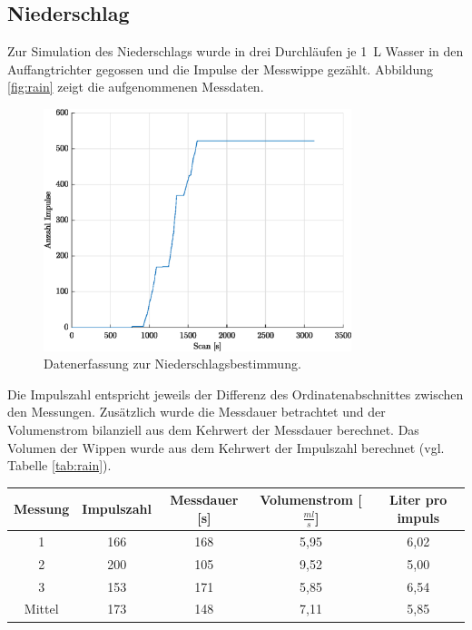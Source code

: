		
\subsection{Niederschlag}
Zur Simulation des Niederschlags wurde in drei Durchläufen je \SI{1}{\liter} Wasser in den Auffangtrichter gegossen und die Impulse der Messwippe gezählt. Abbildung \ref{fig:rain} zeigt die aufgenommenen Messdaten. 

\begin{figure}[H]
	\centering
	\includegraphics[width=0.8\textwidth]{../DATA/Messreihe_Niederschlag.eps}
	\caption[Datenerfassung zur Niederschlagsbestimmung]{Datenerfassung zur Niederschlagsbestimmung.}
	\label{fig:cal2}
\end{figure}

Die Impulszahl entspricht jeweils der Differenz des Ordinatenabschnittes zwischen den Messungen. Zusätzlich wurde die Messdauer betrachtet und der Volumenstrom bilanziell aus dem Kehrwert der Messdauer berechnet. Das Volumen der Wippen wurde aus dem Kehrwert der Impulszahl berechnet (vgl. Tabelle \ref{tab:rain}).

 \begin{center}
 	\begin{tabular}{c|c|c|c|c}
 		\label{tab:rain}
 		\textbf{Messung} & \textbf{Impulszahl} & \textbf{Messdauer} [s] & \textbf{Volumenstrom} [$\frac{ml}{s}$] & \textbf{Liter pro impuls}\\
 		\hline
 		1 & 166 & 168 & 5,95 & 6,02\\
 		2 & 200 & 105 & 9,52 & 5,00\\
 		3 & 153 & 171 & 5,85 & 6,54\\
 		Mittel & 173 & 148 & 7,11 & 5,85
 	\end{tabular}
 \end{center}

